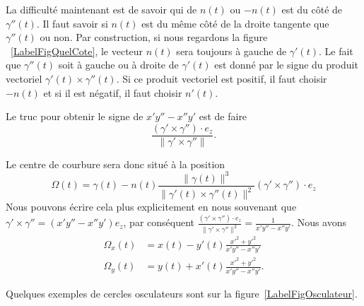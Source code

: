 \newcommand{\CaptionFigQuelCote}{De quel côté de \( \gamma'(t)\) se trouvent \( n(t)\) et \( -n(t)\) ?}


La difficulté maintenant est de savoir qui de \( n(t)\) ou \( -n(t)\) est du côté de \( \gamma''(t)\). Il faut savoir si \( n(t)\) est du même côté de la droite tangente que \( \gamma''(t)\) ou non. Par construction, si nous regardons la figure ~\ref{LabelFigQuelCote}, le vecteur \( n(t)\) sera toujours à gauche de \( \gamma'(t)\). Le fait que \( \gamma''(t)\) soit à gauche ou à droite de \( \gamma'(t)\) est donné par le signe du produit vectoriel \( \gamma'(t)\times \gamma''(t)\). Si ce produit vectoriel est positif, il faut choisir \( -n(t)\) et si il est négatif, il faut choisir \( n'(t)\).

Le truc pour obtenir le signe de \( x'y''-x''y'\) est de faire
\begin{equation}
	\frac{ (\gamma'\times\gamma'')\cdot e_z}{\| \gamma'\times\gamma'' \|}.
\end{equation}

Le centre de courbure sera donc situé à la position
\begin{equation}
	\Omega(t)=\gamma(t)-n(t)\frac{ \| \gamma(t) \|^3 }{ \| \gamma'(t)\times\gamma''(t) \|^2 } (\gamma'\times\gamma'')\cdot e_z
\end{equation}
Nous pouvons écrire cela plus explicitement en nous souvenant que \( \gamma'\times\gamma''=(x'y''-x''y')e_z\), par conséquent \( \frac{ (\gamma'\times\gamma'')\cdot e_z}{\| \gamma'\times\gamma'' \|^2}=\frac{1}{ x'y''-x''y' }\). Nous avons
\begin{subequations}
	\begin{align}
		\Omega_x(t) & =x(t)-y'(t)\frac{ x'^2+y'^2 }{ x'y''-x''y' }  \\
		\Omega_y(t) & =y(t)+x'(t)\frac{ x'^2+y'^2 }{ x'y''-x''y' }.
	\end{align}
\end{subequations}

Quelques exemples de cercles osculateurs sont sur la figure~\ref{LabelFigOsculateur}.
\newcommand{\CaptionFigOsculateur}{Exemple de cercles osculateurs.}



